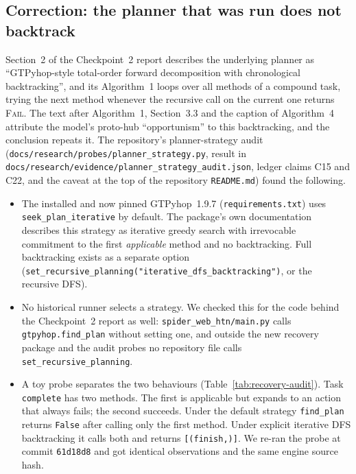 \subsection{Correction: the planner that was run does not backtrack}
\label{sec:recovery-strategy}

Section~2 of the Checkpoint~2 report describes the underlying planner as ``GTPyhop-style total-order
forward decomposition with chronological backtracking'', and its Algorithm~1 loops over all methods of a
compound task, trying the next method whenever the recursive call on the current one returns
\textsc{Fail}. The text after Algorithm~1, Section~3.3 and the caption of Algorithm~4 attribute the
model's proto-hub ``opportunism'' to this backtracking, and the conclusion repeats it. The repository's
planner-strategy audit (\texttt{docs/research/probes/planner\_strategy.py}, result in
\texttt{docs/research/evidence/planner\_strategy\_audit.json}, ledger claims C15 and C22, and the caveat at
the top of the repository \texttt{README.md}) found the following.

\begin{itemize}
  \item The installed and now pinned GTPyhop~1.9.7 (\texttt{requirements.txt}) uses
        \texttt{seek\_plan\_iterative} by default. The package's own documentation describes this
        strategy as iterative greedy search with irrevocable commitment to the first \emph{applicable}
        method and no backtracking. Full backtracking exists as a separate option
        (\texttt{set\_recursive\_planning("iterative\_dfs\_backtracking")}, or the recursive DFS).
  \item No historical runner selects a strategy. We checked this for the code behind the Checkpoint~2
        report as well: \texttt{spider\_web\_htn/main.py} calls \texttt{gtpyhop.find\_plan} without setting
        one, and outside the new recovery package and the audit probes no repository file calls
        \texttt{set\_recursive\_planning}.
  \item A toy probe separates the two behaviours (Table~\ref{tab:recovery-audit}). Task \texttt{complete}
        has two methods. The first is applicable but expands to an action that always fails; the second
        succeeds. Under the default strategy \texttt{find\_plan} returns \texttt{False} after calling only
        the first method. Under explicit iterative DFS backtracking it calls both and returns
        \texttt{[(finish,)]}. We re-ran the probe at commit \texttt{61d18d8} and got identical
        observations and the same engine source hash.
\end{itemize}

